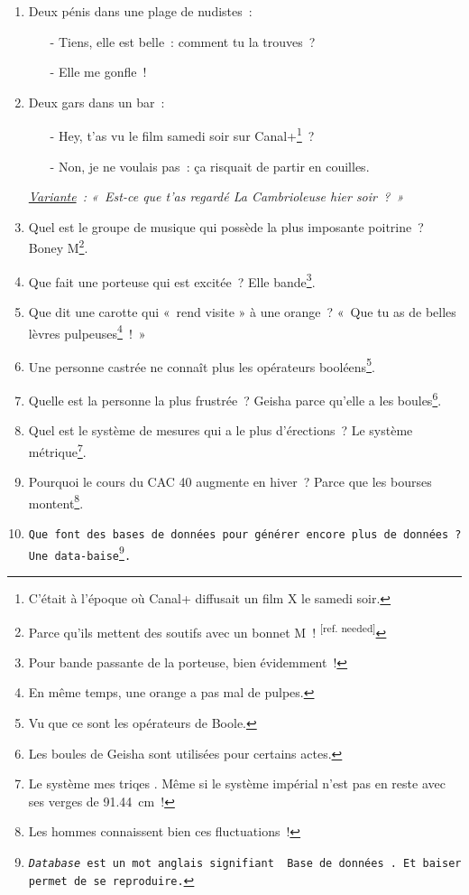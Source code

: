 \documentclass[10pt,a5paper,fullpage]{book}
\begin{document}
\begin{enumerate}
		\item Deux pénis dans une plage de nudistes~: 
		\begin{itemize}
			\item[-] Tiens, elle est belle~: comment tu la trouves~?
			\item[-] Elle me gonfle~!~
		\end{itemize}
		\item Deux gars dans un bar~:
		\begin{itemize}
			\item[-] Hey, t’as vu le film samedi soir sur Canal+\footnote{C'était à l'époque où Canal+ diffusait un film X le samedi soir.}~?
			\item[-] Non, je ne voulais pas~: ça risquait de partir en couilles. 
		\end{itemize}
		\textit{\underline{Variante}~: «~Est-ce que t’as regardé La Cambrioleuse hier soir~?~»}
		\item Quel est le groupe de musique qui possède la plus imposante poitrine~? Boney M\footnote{Parce qu'ils mettent des soutifs avec un bonnet M~! \textsuperscript{[ref. needed]} }.
		\item Que fait une porteuse qui est excitée~? Elle bande\footnote{Pour bande passante de la porteuse, bien évidemment~!}.
		\item Que dit une carotte qui « rend visite » à une orange~? « Que tu as de belles lèvres pulpeuses\footnote{En même temps, une orange a pas mal de pulpes.}~! »
		\item Une personne castrée ne connaît plus les opérateurs booléens\footnote{Vu que ce sont les opérateurs de Boole.}.
		\item Quelle est la personne la plus frustrée~? Geisha parce qu’elle a les boules\footnote{Les boules de Geisha sont utilisées pour certains actes.}.
		\item Quel est le système de mesures qui a le plus d’érections~? Le système métrique\footnote{Le système \guillemotleft mes triqes \guillemotright. Même si le système impérial n'est pas en reste avec ses verges de 91.44~cm~!}.
		\item Pourquoi le cours du CAC 40 augmente en hiver~? Parce que les bourses montent\footnote{Les hommes connaissent bien ces fluctuations~!}. 
		\item \texttt{Que font des bases de données pour générer encore plus de données~? Une data-baise\footnote{\textit{Database} est un mot anglais signifiant \guillemotleft~Base de données~\guillemotright. Et baiser permet de se reproduire. }.}

\end{enumerate}
\end{document}
